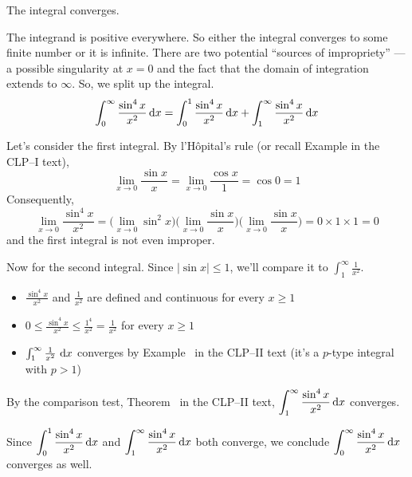 \begin{answer}
The integral converges.
\end{answer}

\begin{solution}
The integrand is positive everywhere. So either the integral
converges to some finite number or it is infinite. There are two potential
``sources of impropriety'' --- a possible singularity at $x=0$ and
the fact that the domain of integration extends to $\infty$.
So, we split up the integral.
\begin{equation*}
\int_0^\infty\frac{\sin^4 x}{x^2}\, \mathrm{d}x
=\int_0^1\frac{\sin^4 x}{x^2}\, \mathrm{d}x
  + \int_1^\infty\frac{\sin^4 x}{x^2}\, \mathrm{d}x
\end{equation*}

Let's consider the first integral. By l'H\^opital's rule
(or recall Example  in the CLP--I text),
\begin{equation*}
\lim_{x\to 0} \frac{\sin x}{x}
=\lim_{x\to 0} \frac{\cos x}{1}
=\cos 0
=1
\end{equation*}
Consequently,
\begin{equation*}
\lim_{x\to 0} \frac{\sin^4 x}{x^2}
=\Big(\lim_{x\to 0} \sin^2 x \Big)
\Big(\lim_{x\to 0} \frac{\sin x}{x} \Big)
\Big(\lim_{x\to 0} \frac{\sin x}{x} \Big)
=0\times 1\times 1
=0
\end{equation*}
and the first integral is not even improper.

Now for the second integral. Since $|\sin x|\le 1$, we'll compare it to $\int_1^\infty \frac{1}{x^2}$.
\begin{itemize}
\item $\frac{\sin^4 x}{x^2}$ and $\frac{1}{x^2}$ are defined and continuous for every $x \geq 1$
\item $0 \leq \frac{\sin^4 x}{x^2} \leq \frac{1^4}{x^2} = \frac{1}{x^2}$ for every $x \geq 1$
\item $\int_1^\infty \frac{1}{x^2}~\mathrm{d}x$ converges by Example~
 in the CLP--II text (it's a $p$-type integral with $p>1$)
\end{itemize}

By the comparison test, Theorem~ in the CLP--II text,
$\displaystyle\int_1^\infty\frac{\sin^4 x}{x^2}\, \mathrm{d}x$ converges.

Since $\displaystyle\int_0^1\frac{\sin^4 x}{x^2}\, \mathrm{d}x$ and $\displaystyle\int_1^\infty\frac{\sin^4 x}{x^2}\, \mathrm{d}x$ both converge, we conclude
$\displaystyle\int_0^\infty\frac{\sin^4 x}{x^2}\, \mathrm{d}x$ converges as well.
\end{solution}


